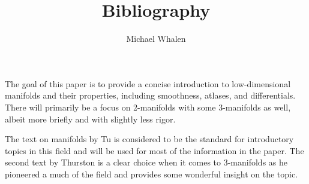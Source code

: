 \documentclass[letterpaper,12pt]{article}
\begin{document}
\title{Bibliography}
\author{Michael Whalen}
\date{}
\maketitle

The goal of this paper is to provide a concise introduction to low-dimensional manifolds and their properties, including smoothness, atlases, and differentials.  There will primarily be a focus on 2-manifolds with some 3-manifolds as well, albeit more briefly and with slightly less rigor.

The text on manifolds by Tu is considered to be the standard for introductory topics in this field and will be used for most of the information in the paper. The second text by Thurston is a clear choice when it comes to 3-manifolds as he pioneered a much of the field and provides some wonderful insight on the topic.

\nocite{*}


\end{document}
